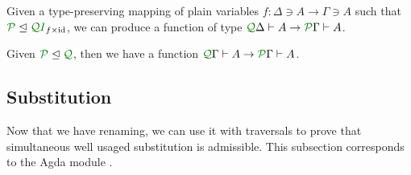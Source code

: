 \documentclass[submission,copyright,creativecommons]{eptcs}
\begin{document}
\begin{corollary}\label{cor:ren}
  Given a type-preserving mapping of plain variables
  $f : \Delta \ni A \to \Gamma \ni A$ such that
  $\resctx P \subres \resctx Q\rescomment I_{f\times\id}$,
  we can produce a function of type
  $\ctx{\Delta}{Q} \vdash A \to \ctx{\Gamma}{P} \vdash A$.
\end{corollary}

\begin{corollary}\label{cor:subusage}
  Given $\resctx P \subres \resctx Q$, then we have a function
  $\ctx{\Gamma}{Q} \vdash A \to \ctx{\Gamma}{P} \vdash A$.
\end{corollary}

\subsection{Substitution}

Now that we have renaming, we can use it with traversals to prove that
simultaneous well usaged substitution is admissible. This subsection
corresponds to the Agda module
\href{https://github.com/laMudri/generic-lr/blob/lin/tlla-submission-2021/src/Specific/Syntax/Substitution.agda\#L9}{}.
\end{document}
